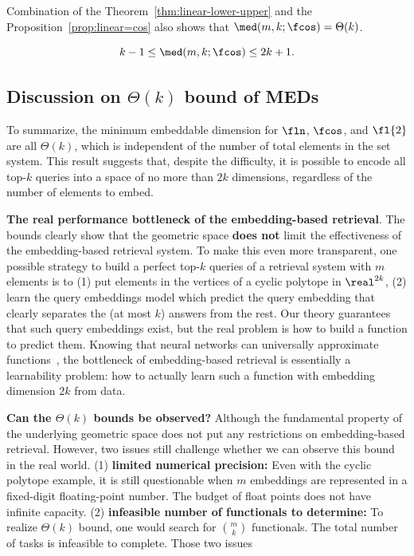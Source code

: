 Combination of the Theorem~\ref{thm:linear-lower-upper} and the Proposition~\ref{prop:linear=cos} also shows that $\med(m, k; \fcos) = \Theta(k)$.

\begin{theorem}\label{thm:cos-lower-upper}
    $$k-1\leq \med(m, k; \fcos) \leq 2k+1.$$
\end{theorem}

\subsection{Discussion on $\Theta(k)$ bound of MEDs}
To summarize, the minimum embeddable dimension for $\fln$, $\fcos$, and $\fl{2}$ are all $\Theta(k)$, which is independent of the number of total elements in the set system. This result suggests that, despite the difficulty, it is possible to encode all top-$k$ queries into a space of no more than $2k$ dimensions, regardless of the number of elements to embed.

\noindent\textbf{The real performance bottleneck of the embedding-based retrieval}. The bounds clearly show that the geometric space \textbf{does not} limit the effectiveness of the embedding-based retrieval system. To make this even more transparent, one possible strategy to build a perfect top-$k$ queries of a retrieval system with $m$ elements is to (1) put elements in the vertices of a cyclic polytope in $\real^{2k}$, (2) learn the query embeddings model which predict the query embedding that clearly separates the (at most $k$) answers from the rest. Our theory guarantees that such query embeddings exist, but the real problem is how to build a function to predict them. Knowing that neural networks can universally approximate functions~\citep {hornik1989multilayer}, the bottleneck of embedding-based retrieval is essentially a learnability problem: how to actually learn such a function with embedding dimension $2k$ from data.

\noindent\textbf{Can the $\Theta(k)$ bounds be observed?} Although the fundamental property of the underlying geometric space does not put any restrictions on embedding-based retrieval. However, two issues still challenge whether we can observe this bound in the real world. (1) \textbf{limited numerical precision:} Even with the cyclic polytope example, it is still questionable when $m$ embeddings are represented in a fixed-digit floating-point number. The budget of float points does not have infinite capacity. (2) \textbf{infeasible number of functionals to determine:} To realize $\Theta(k)$ bound, one would search for $\binom{m}{k}$ functionals. The total number of tasks is infeasible to complete. Those two issues 


